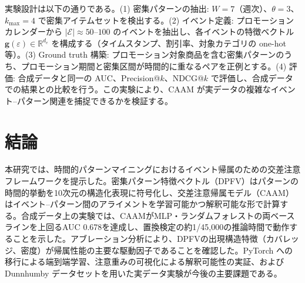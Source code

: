 \documentclass[sigconf,nonacm]{acmart}
\begin{document}
実験設計は以下の通りである。(1) 密集パターンの抽出: $W = 7$（週次）、$\theta = 3$、$k_{\max} = 4$ で密集アイテムセットを検出する。(2) イベント定義: プロモーションカレンダーから $|\mathcal{E}| \approx 50$--$100$ のイベントを抽出し、各イベントの特徴ベクトル $\mathbf{g}(\varepsilon) \in \mathbb{R}^{d_e}$ を構成する（タイムスタンプ、割引率、対象カテゴリの one-hot 等）。(3) Ground truth 構築: プロモーション対象商品を含む密集パターンのうち、プロモーション期間と密集区間が時間的に重なるペアを正例とする。(4) 評価: 合成データと同一の AUC、Precision@$k$、NDCG@$k$ で評価し、合成データでの結果との比較を行う。この実験により、CAAM が実データの複雑なイベント--パターン関連を捕捉できるかを検証する。

\section{結論}
\label{sec:conclusion}

本研究では、時間的パターンマイニングにおけるイベント帰属のための交差注意フレームワークを提示した。密集パターン特徴ベクトル（DPFV）はパターンの時間的挙動を10次元の構造化表現に符号化し、交差注意帰属モデル（CAAM）はイベント--パターン間のアライメントを学習可能かつ解釈可能な形で計算する。合成データ上の実験では、CAAMがMLP・ランダムフォレストの両ベースラインを上回るAUC 0.678を達成し、置換検定の約1/45,000の推論時間で動作することを示した。アブレーション分析により、DPFVの出現構造特徴（カバレッジ、密度）が帰属性能の主要な駆動因子であることを確認した。PyTorch への移行による端到端学習、注意重みの可視化による解釈可能性の実証、および Dunnhumby データセットを用いた実データ実験が今後の主要課題である。



\end{document}
